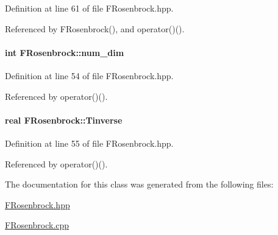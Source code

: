 \-Definition at line 61 of file \-F\-Rosenbrock.\-hpp.



\-Referenced by \-F\-Rosenbrock(), and operator()().

\hypertarget{classFRosenbrock_a3f272a55285032eee5564b0f76e9d173}{
\paragraph[{num\-\_\-dim}]{\setlength{\rightskip}{0pt plus 5cm}int {\bf \-F\-Rosenbrock\-::num\-\_\-dim}}}\label{classFRosenbrock_a3f272a55285032eee5564b0f76e9d173}


\-Definition at line 54 of file \-F\-Rosenbrock.\-hpp.



\-Referenced by operator()().

\hypertarget{classFRosenbrock_a3c530d7ceef6d4fd854ab755a70c786e}{
\paragraph[{\-Tinverse}]{\setlength{\rightskip}{0pt plus 5cm}real {\bf \-F\-Rosenbrock\-::\-Tinverse}}}\label{classFRosenbrock_a3c530d7ceef6d4fd854ab755a70c786e}


\-Definition at line 55 of file \-F\-Rosenbrock.\-hpp.



\-Referenced by operator()().



\-The documentation for this class was generated from the following files\-:\begin{DoxyCompactItemize}
\item 
\hyperlink{FRosenbrock_8hpp}{\-F\-Rosenbrock.\-hpp}\item 
\hyperlink{FRosenbrock_8cpp}{\-F\-Rosenbrock.\-cpp}\end{DoxyCompactItemize}
